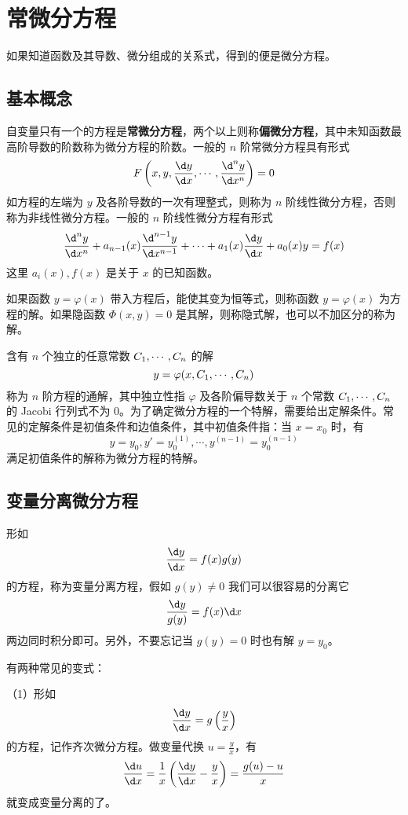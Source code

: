 \chapter{常微分方程}

如果知道函数及其导数、微分组成的关系式，得到的便是微分方程。

\section{基本概念}

自变量只有一个的方程是\textbf{常微分方程}，两个以上则称\textbf{偏微分方程}，其中未知函数最高阶导数的阶数称为微分方程的阶数。一般的 $n$ 阶常微分方程具有形式
\[ F\left(x, y, \frac{\d y}{\d x}, \cdots, \frac{\d^n y}{\d x^n} \right) = 0 \]
如方程的左端为 $y$ 及各阶导数的一次有理整式，则称为 $n$ 阶线性微分方程，否则称为非线性微分方程。一般的 $n$ 阶线性微分方程有形式
\[ \frac{\d^n y}{\d x^n} + a_{n-1}(x) \frac{\d^{n-1} y}{\d x^{n-1}} + \cdots + a_1(x) \frac{\d y}{\d x} + a_0(x) y = f(x) \]
这里 $a_i(x), f(x)$ 是关于 $x$ 的已知函数。

如果函数 $y = \varphi(x)$ 带入方程后，能使其变为恒等式，则称函数 $y=\varphi(x)$ 为方程的解。如果隐函数 $\Phi(x, y) = 0$ 是其解，则称隐式解，也可以不加区分的称为解。

含有 $n$ 个独立的任意常数 $C_1,\cdots,C_n$ 的解
\[ y = \varphi(x, C_1,\cdots,C_n) \]
称为 $n$ 阶方程的通解，其中独立性指 $\varphi$ 及各阶偏导数关于 $n$ 个常数 $C_1,\cdots,C_n$ 的 Jacobi 行列式不为 $0$。为了确定微分方程的一个特解，需要给出定解条件。常见的定解条件是初值条件和边值条件，其中初值条件指：当 $x = x_0$ 时，有
\[ y=y_0, y' = y_0^{(1)}, \cdots, y^{(n-1)} = y_0^{(n-1)} \]
满足初值条件的解称为微分方程的特解。

\section{变量分离微分方程}

形如
\[ \frac{\d y}{\d x} = f(x) g(y) \]
的方程，称为变量分离方程，假如 $g(y) \neq 0$ 我们可以很容易的分离它
\[ \frac{\d y}{g(y)} = f(x) \d x \]
两边同时积分即可。另外，不要忘记当 $g(y) = 0$ 时也有解 $y=y_0$。

有两种常见的变式：

（1）形如
\[ \frac{\d y}{\d x} = g\left(\frac{y}{x}\right) \]
的方程，记作齐次微分方程。做变量代换 $u = \frac{y}{x}$，有
\[ \frac{\d u}{\d x} = \frac{1}{x} \left(\frac{\d y}{\d x} -\frac{y}{x} \right) = \frac{g(u) - u}{x} \]
就变成变量分离的了。

